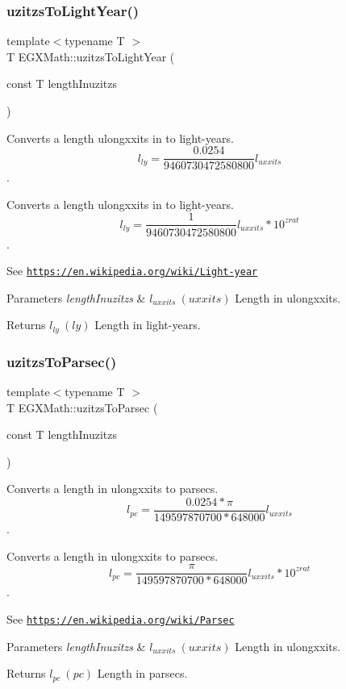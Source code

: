 \subsubsection{\texorpdfstring{uzitzs\+To\+Light\+Year()}{uzitzsToLightYear()}}
{\footnotesize\ttfamily template$<$typename T $>$ \\
T E\+G\+X\+Math\+::uzitzs\+To\+Light\+Year (\begin{DoxyParamCaption}\item[{const T}]{length\+Inuzitzs }\end{DoxyParamCaption})}



Converts a length ulongxxits in to light-\/years. \[ l_{ly}= \frac{0.0254}{9460730472580800} l_{uxxits} \]. 

Converts a length ulongxxits in to light-\/years. \[ l_{ly}= \frac{1}{9460730472580800} l_{uxxits} * 10^{zrat} \].

See \href{https://en.wikipedia.org/wiki/Light-year}{\tt https\+://en.\+wikipedia.\+org/wiki/\+Light-\/year} 
\begin{DoxyParams}{Parameters}
{\em length\+Inuzitzs} & $ l_{uxxits}\ (uxxits)$ Length in ulongxxits. \\
\hline
\end{DoxyParams}
\begin{DoxyReturn}{Returns}
$ l_{ly}\ (ly)$ Length in light-\/years. 
\end{DoxyReturn}
\mbox{\label{group___e_g_x_math-_conversions-_length_conversions-_imperial-uzitzs-_astronomical_ga028a17a589e3f3d0c09daa6fbe664989}} 
\subsubsection{\texorpdfstring{uzitzs\+To\+Parsec()}{uzitzsToParsec()}}
{\footnotesize\ttfamily template$<$typename T $>$ \\
T E\+G\+X\+Math\+::uzitzs\+To\+Parsec (\begin{DoxyParamCaption}\item[{const T}]{length\+Inuzitzs }\end{DoxyParamCaption})}



Converts a length in ulongxxits to parsecs. \[ l_{pc}=\frac{0.0254 * \pi}{149597870700 * 648000} l_{uxxits} \]. 

Converts a length in ulongxxits to parsecs. \[ l_{pc}=\frac{\pi}{149597870700 * 648000} l_{uxxits} * 10^{zrat} \].

See \href{https://en.wikipedia.org/wiki/Parsec}{\tt https\+://en.\+wikipedia.\+org/wiki/\+Parsec} 
\begin{DoxyParams}{Parameters}
{\em length\+Inuzitzs} & $ l_{uxxits}\ (uxxits)$ Length in ulongxxits. \\
\hline
\end{DoxyParams}
\begin{DoxyReturn}{Returns}
$ l_{pc}\ (pc)$ Length in parsecs. 
\end{DoxyReturn}

